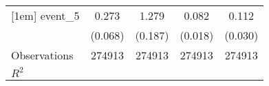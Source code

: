{\begin{tabular}{l*{4}{c}}
[1em]
event\_5             &       0.273\sym{***}&       1.279\sym{***}&       0.082\sym{***}&       0.112\sym{***}\\
                    &     (0.068)         &     (0.187)         &     (0.018)         &     (0.030)         \\
\hline
Observations        &      274913         &      274913         &      274913         &      274913         \\
\(R^{2}\)           &                     &                     &                     &                     \\
\hline\hline
\end{tabular}
}
